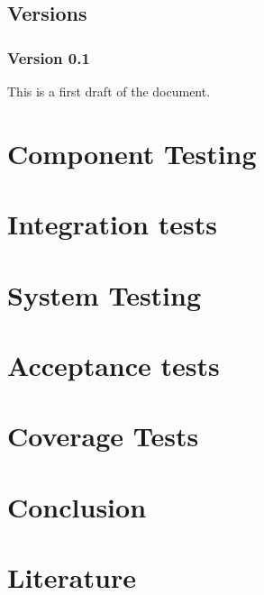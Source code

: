 \documentclass[signature]{deltares_report}
\begin{document}
\section{Versions}
\label{sec:Versions}

\subsection{Version 0.1}
\label{sec:Version}
This is a first draft of the document.

\chapter{Component Testing} 
\label{chapterUnitTest}


\chapter{Integration tests}
\label{chapterIntegrationTests}


\chapter{System Testing} 
\label{chapterSystemTest}


\chapter{Acceptance tests} 
\label{chapterAcceptanceTest}


\chapter{Coverage Tests} 
\label{chapterCoverage}


\chapter{Conclusion} 
\label{chapterConclusion}


\chapter{Literature}  \label{chapterLiterature}



\pagestyle{empty}
\mbox{}

\end{document}
